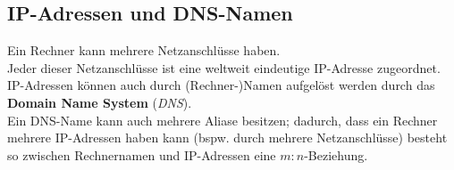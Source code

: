 \subsection{IP-Adressen und DNS-Namen}

Ein Rechner kann mehrere Netzanschlüsse haben.\\

\noindent
Jeder dieser Netzanschlüsse ist eine weltweit eindeutige IP-Adresse zugeordnet.\\

\noindent
IP-Adressen können auch durch (Rechner-)Namen aufgelöst werden durch das \textbf{Domain Name System} (\textit{DNS}).\\

\noindent
Ein DNS-Name kann auch mehrere Aliase besitzen; dadurch, dass ein Rechner mehrere IP-Adressen haben kann (bspw. durch mehrere Netzanschlüsse) besteht so zwischen Rechnernamen und IP-Adressen eine $m:n$-Beziehung.